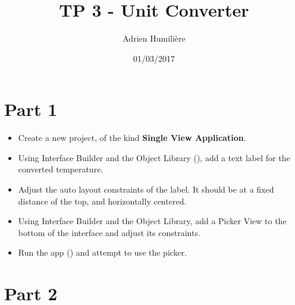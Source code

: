 \documentclass[a4paper,11pt]{scrartcl}
\begin{document}
\newcommand{\mytitle}{TP 3 - Unit Converter}
\title{\mytitle}
\author{Adrien Humilière}
\date{01/03/2017}

\maketitle

\section*{Part 1}

\begin{itemize}
\item Create a new project, of the kind \textbf{Single View Application}.
\item Using Interface Builder and the Object Library (), add a text label for the converted temperature.
\item Adjust the auto layout constraints of the label. It should be at a fixed distance of the top, and horizontally centered.
\item Using Interface Builder and the Object Library, add a Picker View to the bottom of the interface and adjust its constraints.
\item Run the app () and attempt to use the picker.
\end{itemize}

\section*{Part 2}
\end{document}
